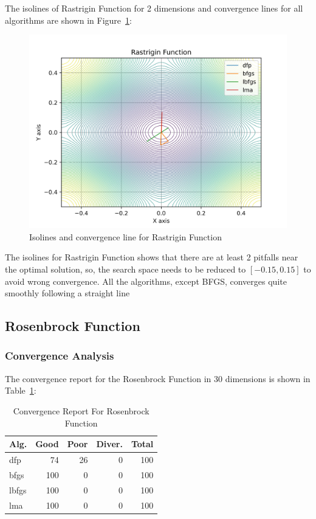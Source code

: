 \documentclass[conference]{IEEEtran}
\begin{document}
The isolines of Rastrigin Function for 2 dimensions and convergence lines for all algorithms are shown in Figure~\ref{fig:rastrigin2d}:\begin{figure}[H]
\centering
\caption{Isolines and convergence line for Rastrigin Function}
\label{fig:rastrigin2d}
\includegraphics[scale=0.5]{images/rastrigin2d.jpg}
\end{figure}
The isolines for Rastrigin Function shows that there are at least 2 pitfalls near the optimal solution, so, the search space needs to be reduced to $[-0.15, 0.15]$ to avoid wrong convergence. All the algorithms, except BFGS, converges quite smoothly following a straight line\subsection{Rosenbrock Function}
\label{rosenbrock2d2D}

\subsubsection{Convergence Analysis}
\label{convergencerosenbrock2d2D}


The convergence report for the Rosenbrock Function in 30 dimensions is shown in Table~\ref{convergence:rosenbrock2d}:

\begin{table}[H]
\centering
\caption{Convergence Report For Rosenbrock Function}
\label{convergence:rosenbrock2d}
\begin{tabular}{lrrrr}
\toprule
 Alg. &  Good &  Poor &  Diver. &  Total \\
\midrule
  dfp &    74 &    26 &       0 &    100 \\
 bfgs &   100 &     0 &       0 &    100 \\
lbfgs &   100 &     0 &       0 &    100 \\
  lma &   100 &     0 &       0 &    100 \\
\bottomrule
\end{tabular}
\end{table}
\end{document}
